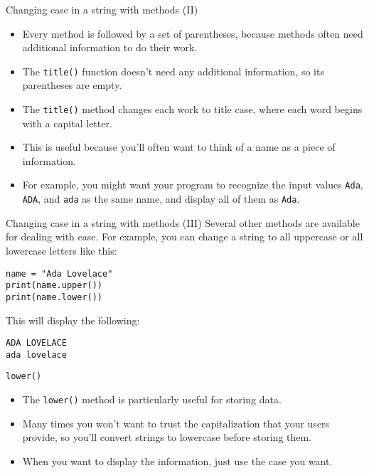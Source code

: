\documentclass[aspectratio=169]{beamer}
\begin{document}
\begin{frame}{Changing case in a string with methods (II)}
    \begin{itemize}[label=--]
        \item Every method is followed by a set of parentheses, because methods often need additional information to do their work.
        \item The \texttt{title()} function doesn't need any additional information, so its parentheses are empty.
        \item The \texttt{title()} method changes each work to title case, where each word begins with a capital letter.
        \item This is useful because you'll often want to think of a name as a piece of information.
        \item For example, you might want your program to recognize the input values \texttt{Ada}, \texttt{ADA}, and \texttt{ada} as the same name, and display all of them as \texttt{Ada}.
    \end{itemize}
\end{frame}


\begin{frame}[fragile]{Changing case in a string with methods (III)}
    Several other methods are available for dealing with case.
    For example, you can change a string to all uppercase or all lowercase letters like this:
    \vspace{10pt}
    \begin{Verbatim}
name = "Ada Lovelace"
print(name.upper())
print(name.lower())
    \end{Verbatim}
    \vspace{15pt}
    This will display the following:
    \vspace{10pt}
    \begin{Verbatim}
ADA LOVELACE
ada lovelace
    \end{Verbatim}
\end{frame}


\begin{frame}{\texttt{lower()}}
    \begin{itemize}[label=--]
        \item The \texttt{lower()} method is particularly useful for storing data.
        \item Many times you won't want to trust the capitalization that your users provide, so you'll convert strings to lowercase before storing them.
        \item When you want to display the information, just use the case you want.
    \end{itemize}
\end{frame}
\end{document}
